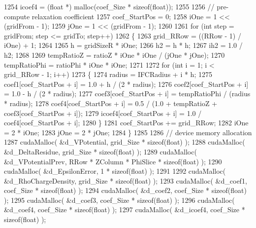 \begin{DoxyCode}
1254     icoef4 = (\textcolor{keywordtype}{float} *) malloc(coef\_Size * \textcolor{keyword}{sizeof}(\textcolor{keywordtype}{float}));
1255 
1256     \textcolor{comment}{// pre-compute relaxation coefficient}
1257     coef\_StartPos = 0;
1258     iOne = 1 << (gridFrom - 1); 
1259     jOne = 1 << (gridFrom - 1);
1260     
1261     \textcolor{keywordflow}{for} (\textcolor{keywordtype}{int} step = gridFrom; step <= gridTo; step++)
1262     \{
1263         grid\_RRow = ((RRow - 1) / iOne) + 1;
1264 
1265         h = gridSizeR * iOne;
1266         h2 = h * h;
1267         ih2 = 1.0 / h2;
1268 
1269         tempRatioZ = ratioZ * iOne * iOne / (jOne * jOne);
1270         tempRatioPhi = ratioPhi * iOne * iOne;
1271 
1272         \textcolor{keywordflow}{for} (\textcolor{keywordtype}{int} i = 1; i < grid\_RRow - 1; i++)
1273         \{
1274             radius = IFCRadius + i * h;
1275             coef1[coef\_StartPos + i] = 1.0 + h / (2 * radius);
1276             coef2[coef\_StartPos + i] = 1.0 - h / (2 * radius);
1277             coef3[coef\_StartPos + i] = tempRatioPhi / (radius * radius);
1278             coef4[coef\_StartPos + i] = 0.5 / (1.0 + tempRatioZ + coef3[coef\_StartPos + i]);
1279             icoef4[coef\_StartPos + i] = 1.0 / coef4[coef\_StartPos + i];
1280         \}
1281         coef\_StartPos += grid\_RRow;
1282         iOne = 2 * iOne;
1283         jOne = 2 * jOne;
1284     \}
1285 
1286     \textcolor{comment}{// device memory allocation}
1287     cudaMalloc( &d\_VPotential, grid\_Size * \textcolor{keyword}{sizeof}(\textcolor{keywordtype}{float}) );
1288     cudaMalloc( &d\_DeltaResidue, grid\_Size * \textcolor{keyword}{sizeof}(\textcolor{keywordtype}{float}) );
1289     cudaMalloc( &d\_VPotentialPrev, RRow * ZColumn * PhiSlice * \textcolor{keyword}{sizeof}(\textcolor{keywordtype}{float}) );
1290     cudaMalloc( &d\_EpsilonError, 1 * \textcolor{keyword}{sizeof}(\textcolor{keywordtype}{float}) );   
1291         
1292     cudaMalloc( &d\_RhoChargeDensity, grid\_Size * \textcolor{keyword}{sizeof}(\textcolor{keywordtype}{float}) );
1293     cudaMalloc( &d\_coef1, coef\_Size * \textcolor{keyword}{sizeof}(\textcolor{keywordtype}{float}) );
1294     cudaMalloc( &d\_coef2, coef\_Size * \textcolor{keyword}{sizeof}(\textcolor{keywordtype}{float}) );
1295     cudaMalloc( &d\_coef3, coef\_Size * \textcolor{keyword}{sizeof}(\textcolor{keywordtype}{float}) );
1296     cudaMalloc( &d\_coef4, coef\_Size * \textcolor{keyword}{sizeof}(\textcolor{keywordtype}{float}) );
1297     cudaMalloc( &d\_icoef4, coef\_Size * \textcolor{keyword}{sizeof}(\textcolor{keywordtype}{float}) );

\end{DoxyCode}
